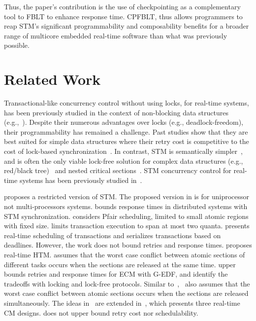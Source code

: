 \documentclass[conference]{IEEEtran}
\begin{document}
Thus, the paper's contribution is the use of checkpointing as a complementary tool to FBLT to enhance response time. CPFBLT, thus allows programmers to reap STM's significant programmability and composability benefits for a broader range of multicore embedded real-time software than what was previously possible.

\section{Related Work}
\label{sec:past}

Transactional-like concurrency control without using locks, for real-time systems, has been previously studied in the context of non-blocking data structures (e.g.,~\cite{anderson95realtime}). Despite their numerous advantages over locks 
(e.g., deadlock-freedom), their programmability has remained a challenge. Past studies show that they are best suited for simple data structures where their retry cost is competitive to the cost of lock-based synchronization~\cite{bc+08}.  In contrast, STM is semantically simpler~\cite{Herlihy:2006:AMP:1146381.1146382}, and is often the only viable lock-free solution for complex data structures (e.g., red/black tree)~\cite{key-1} and nested critical sections~\cite{Saha:2006:MHP:1122971.1123001}. STM concurrency control for real-time systems has been previously studied in~\cite{manson2006preemptible,fahmy2009bounding,sarni2009real,schoeberl2010rttm,key-1,barrosmanaging,stmconcurrencycontrol:emsoft11,lcmdac2012,pnf_dac_asp,fblt}.

\cite{manson2006preemptible} proposes a restricted version of STM. The proposed version in \cite{manson2006preemptible} is for uniprocessor not multi-processors systems. \cite{fahmy2009bounding} bounds response times in distributed  systems with STM synchronization. \cite{fahmy2009bounding} considers Pfair scheduling, limited to small atomic regions with fixed size. \cite{fahmy2009bounding} limits transaction execution to span at most two quanta. \cite{sarni2009real} presents real-time scheduling of transactions and serializes transactions based on deadlines. However, the work does not bound retries and response times. \cite{schoeberl2010rttm} proposes real-time HTM. \cite{schoeberl2010rttm} assumes that the worst case conflict between atomic sections of different tasks occurs when the sections are released at the same time. \cite{key-1} upper bounds retries and response times for ECM with G-EDF, and identify the tradeoffs with locking and lock-free protocols. Similar to~\cite{schoeberl2010rttm},~\cite{key-1} also assumes that the worst case conflict between atomic sections occurs when the sections are released simultaneously. The ideas in~\cite{key-1} are extended in~\cite{barrosmanaging}, which presents three real-time CM designs. \cite{key-1} does not upper bound retry cost nor schedulability. 
 
\end{document}
